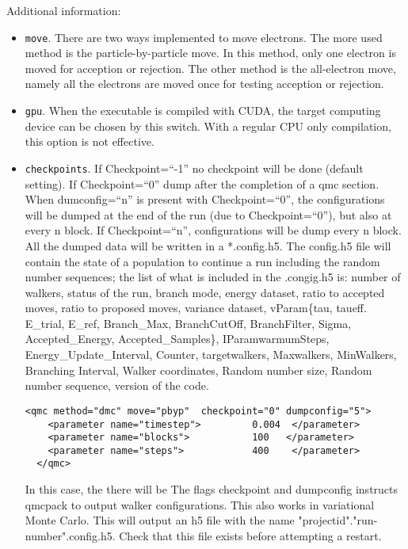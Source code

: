 Additional information:
\begin{itemize}
\item \texttt{move}. There are two ways implemented to move electrons. The more used method is the particle-by-particle move. In this method, only one electron is moved for acception or rejection. The other method is the all-electron move, namely all the electrons are moved once for testing acception or rejection.

\item \texttt{gpu}. When the executable is compiled with CUDA, the target computing device can be chosen by this switch. With a regular CPU only compilation, this option is not effective.

\item \texttt{checkpoints}. If Checkpoint=``-1'' no checkpoint will be done (default setting). If Checkpoint=``0'' dump after the completion of a qmc section. When dumconfig=``n'' is present with Checkpoint=``0'', the configurations will be dumped at the end of the run (due to Checkpoint=``0''), but also at every n block. If Checkpoint=``n'', configurations will be dump every n block.\\ 
All the dumped data will be written in a *.config.h5. The config.h5 file will contain the state of a population to continue a run including the random number sequences; the list of what is included in the .congig.h5 is: number of walkers, status of the run, branch mode, energy dataset, ratio to accepted moves, ratio to proposed moves, variance dataset, vParam\{tau, taueff. E\_trial, E\_ref, Branch\_Max, BranchCutOff, BranchFilter, Sigma, Accepted\_Energy, Accepted\_Samples\}, IParam{warmumSteps, Energy\_Update\_Interval, Counter, targetwalkers, Maxwalkers, MinWalkers, Branching Interval}, Walker coordinates, Random number size, Random number sequence, version of the code.

\begin{lstlisting}[caption=The following is an example of running a simulation that can be restarted . ]
  <qmc method="dmc" move="pbyp"  checkpoint="0" dumpconfig="5">
    <parameter name="timestep">         0.004  </parameter>
    <parameter name="blocks">           100   </parameter>
    <parameter name="steps">            400    </parameter>
  </qmc>
\end{lstlisting}

In this case, the there will be 
The flags checkpoint and dumpconfig instructs qmcpack to output walker configurations.  This also
works in variational Monte Carlo.  This will output an h5 file with the name "projectid"."run-number".config.h5.
Check that this file exists before attempting a restart.


\end{itemize}
